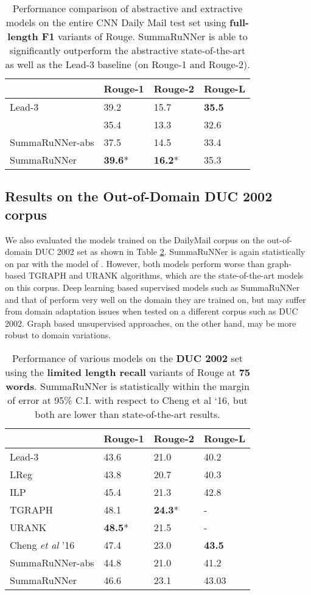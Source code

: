 \documentclass[letterpaper]{article}
\begin{document}
\begin{table}[ht]
\centering
\begin{tabular}{|l|l|l|l|}
\hline
 & Rouge-1 & Rouge-2 & Rouge-L \\
 \hline
 Lead-3 & 39.2 & 15.7 & {\bf 35.5} \\
\cite{nallapati_conll} & 35.4 & 13.3 & 32.6  \\
SummaRuNNer-abs & 37.5 & 14.5 & 33.4 \\
SummaRuNNer & {\bf 39.6}* & {\bf 16.2}* & 35.3 \\
\hline
\end{tabular}
\caption{{\small Performance comparison of abstractive and extractive models on the entire CNN Daily Mail test set using {\bf full-length F1} variants of Rouge. SummaRuNNer is able to significantly outperform the abstractive state-of-the-art as well as the Lead-3 baseline (on Rouge-1 and Rouge-2).}}
\label{tab:perf_cnndailymail}
\end{table}

\subsection{Results on the Out-of-Domain DUC 2002 corpus}

We also evaluated the models trained on the DailyMail corpus on the out-of-domain DUC 2002 set as shown in Table \ref{tab:perf_duc2002}. SummaRuNNer is again statistically on par with the model of \cite{jianpeng}. However, both models perform worse than graph-based TGRAPH \cite{tgraph} and URANK \cite{urank} algorithms, which are the state-of-the-art models on this corpus.  Deep learning based supervised models such as SummaRuNNer and that of \cite{jianpeng} perform very well on the domain they are trained on, but may suffer from domain adaptation issues when tested on a different corpus such as DUC 2002. Graph based unsupervised approaches, on the other hand, may be more robust to domain variations.

\begin{table}[ht]
\centering
\begin{tabular}{|l|l|l|l|}
\hline
 & Rouge-1 & Rouge-2 & Rouge-L \\
 \hline
Lead-3  & 43.6 & 21.0 & 40.2 \\
LReg & 43.8 & 20.7 & 40.3 \\
ILP & 45.4 & 21.3 & 42.8 \\
TGRAPH & 48.1 & {\bf 24.3}* & - \\
URANK & {\bf 48.5}* & 21.5 & - \\
Cheng {\it et al} '16 & 47.4 & 23.0 & {\bf 43.5} \\
SummaRuNNer-abs & 44.8 & 21.0 & 41.2 \\
SummaRuNNer &  46.6   & 23.1  & 43.03  \\
\hline
\end{tabular}
\caption{{\small Performance of various models on the {\bf DUC 2002} set using the {\bf limited length recall} variants of Rouge at {\bf 75 words}. SummaRuNNer is statistically within the margin of error at 95\% C.I. with respect to Cheng et al `16, but both are lower than state-of-the-art results.}}
\label{tab:perf_duc2002}
\end{table}
\end{document}
